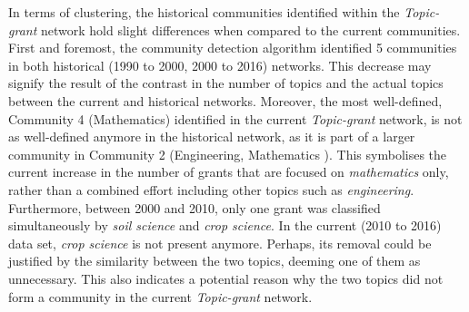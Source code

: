 In terms of clustering, the historical communities identified within the \textit{Topic-grant} network hold slight differences when compared to the current communities. First and foremost, the community detection algorithm identified 5 communities in both historical (1990 to 2000, 2000 to 2016) networks. This decrease may signify the result of the contrast in the number of topics and the actual topics between the current and historical networks. Moreover, the most well-defined, Community 4 (Mathematics) identified in the current \textit{Topic-grant} network, is not as well-defined anymore in the historical network, as it is part of a larger community in Community 2 (Engineering, Mathematics ). This symbolises the current increase in the number of grants that are focused on \textit{mathematics} only, rather than a combined effort including other topics such as \textit{engineering}. Furthermore, between 2000 and 2010, only one grant was classified simultaneously by \textit{soil science} and \textit{crop science}. In the current (2010 to 2016) data set, \textit{crop science} is not present anymore. Perhaps, its removal could be justified by the similarity between the two topics, deeming one of them as unnecessary. This also indicates a potential reason why the two topics did not form a community in the current \textit{Topic-grant} network.

